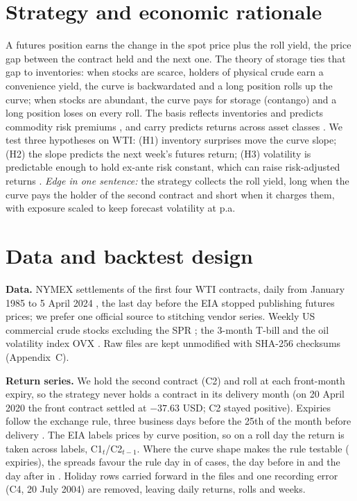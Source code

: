 \documentclass[10pt,a4paper]{article}
\begin{document}
\section{Strategy and economic rationale}
A futures position earns the change in the spot price plus the roll yield, the price gap between the contract held and the next one. The theory of storage \citep{kaldor1939,working1949} ties that gap to inventories: when stocks are scarce, holders of physical crude earn a convenience yield, the curve is backwardated and a long position rolls up the curve; when stocks are abundant, the curve pays for storage (contango) and a long position loses on every roll. The basis reflects inventories and predicts commodity risk premiums \citep{gorton2013}, and carry predicts returns across asset classes \citep{koijen2018}. We test three hypotheses on WTI: (H1) inventory surprises move the curve slope; (H2) the slope predicts the next week's futures return; (H3) volatility is predictable enough to hold ex-ante risk constant, which can raise risk-adjusted returns \citep{moreira2017}. \emph{Edge in one sentence:} the strategy collects the roll yield, long when the curve pays the holder of the second contract and short when it charges them, with exposure scaled to keep forecast volatility at \NTargetVol{} p.a.

\section{Data and backtest design}
\textbf{Data.} NYMEX settlements of the first four WTI contracts, daily from January 1985 to 5 April 2024 \citep{eiafutures}, the last day before the EIA stopped publishing futures prices; we prefer one official source to stitching vendor series. Weekly US commercial crude stocks excluding the SPR \citep{eiastocks}; the 3-month T-bill and the oil volatility index OVX \citep{fred}. Raw files are kept unmodified with SHA-256 checksums (Appendix~C).

\textbf{Return series.} We hold the second contract (C2) and roll at each front-month expiry, so the strategy never holds a contract in its delivery month (on 20 April 2020 the front contract settled at $-37.63$ USD; C2 stayed positive). Expiries follow the exchange rule, three business days before the 25th of the month before delivery \citep{cmerule200}. The EIA labels prices by curve position, so on a roll day the return is taken across labels, C1$_t$/C2$_{t-1}$. Where the curve shape makes the rule testable (\NRollAgreeN{} expiries), the spreads favour the rule day in \NRollAgree{} of cases, the day before in \NRollBefore{} and the day after in \NRollAfter. Holiday rows carried forward in the files and one recording error (C4, 20 July 2004) are removed, leaving \NNDaily{} daily returns, \NNRolls{} rolls and \NNWeekly{} weeks.
\end{document}
